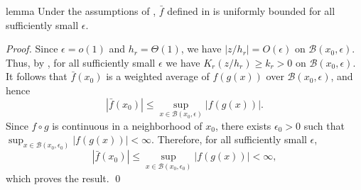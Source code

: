 \documentclass[11pt]{article}
\begin{document}
\begin{appendices}
\begin{restatable}{lemma}{} \label{lemma: fbar bound}
    Under the assumptions of , $\bar f$ defined in  is uniformly bounded for all sufficiently small $\epsilon$.
\end{restatable}
\noindent \textit{Proof.} Since $\epsilon=o(1)$ and $h_r=\Theta(1)$, we have $|z/h_r|=O(\epsilon)$ on $\mathcal{B}(x_0,\epsilon)$. Thus, by , for all sufficiently small $\epsilon$ we have $K_r(z/h_r)\geq k_r>0$ on $\mathcal{B}(x_0,\epsilon)$. It follows that $\bar f(x_0)$ is a weighted average of $f(g(x))$ over $\mathcal{B}(x_0,\epsilon)$, and hence
\[
    |\bar f(x_0)|
    \leq
    \sup_{x\in\mathcal{B}(x_0,\epsilon)}|f(g(x))|.
\]
Since $f\circ g$ is continuous in a neighborhood of $x_0$, there exists $\epsilon_0>0$ such that $\sup_{x\in\mathcal{B}(x_0,\epsilon_0)}|f(g(x))|<\infty$. Therefore, for all sufficiently small $\epsilon$,
\[
    |\bar f(x_0)|
    \leq
    \sup_{x\in\mathcal{B}(x_0,\epsilon_0)}|f(g(x))|
    <\infty,
\]
which proves the result. \qed{}



\end{appendices}
\end{document}
